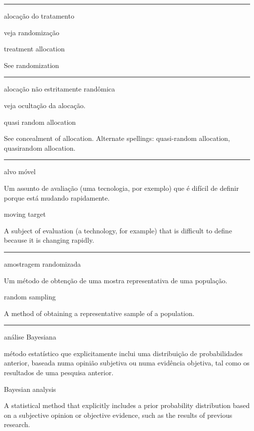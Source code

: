 \documentclass[
  openany]{book}
\begin{document}
\begin{center}\rule{0.5\linewidth}{0.5pt}\end{center}

alocação do tratamento

veja randomização

treatment allocation

See randomization

\begin{center}\rule{0.5\linewidth}{0.5pt}\end{center}

alocação não estritamente randômica

veja ocultação da alocação.

quasi random allocation

See concealment of allocation. Alternate spellings: quasi-random allocation, quasirandom allocation.

\begin{center}\rule{0.5\linewidth}{0.5pt}\end{center}

alvo móvel

Um assunto de avaliação (uma tecnologia, por exemplo) que é difícil de definir porque está mudando rapidamente.

moving target

A subject of evaluation (a technology, for example) that is difficult to define because it is changing rapidly.

\begin{center}\rule{0.5\linewidth}{0.5pt}\end{center}

amostragem randomizada

Um método de obtenção de uma mostra representativa de uma população.

random sampling

A method of obtaining a representative sample of a population.

\begin{center}\rule{0.5\linewidth}{0.5pt}\end{center}

análise Bayesiana

método estatístico que explicitamente inclui uma distribuição de probabilidades anterior, baseada numa opinião subjetiva ou numa evidência objetiva, tal como os resultados de uma pesquisa anterior.

Bayesian analysis

A statistical method that explicitly includes a prior probability distribution based on a subjective opinion or objective evidence, such as the results of previous research.
\end{document}
